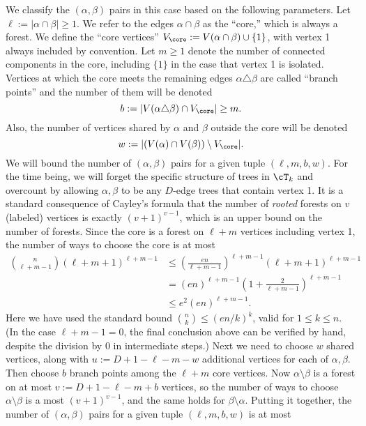 \documentclass[11pt]{article}
\begin{document}
We classify the $(\alpha,\beta)$ pairs in this case based on the following parameters. Let $\ell := |\alpha \cap \beta| \ge 1$. We refer to the edges $\alpha \cap \beta$ as the ``core,'' which is always a forest. We define the ``core vertices'' $V_\core := V(\alpha \cap \beta) \cup \{1\}$, with vertex 1 always included by convention. Let $m \ge 1$ denote the number of connected components in the core, including $\{1\}$ in the case that vertex 1 is isolated. Vertices at which the core meets the remaining edges $\alpha \triangle \beta$ are called ``branch points'' and the number of them will be denoted
\begin{equation}\label{eq:def-b}
b := |V(\alpha \triangle \beta) \cap V_\core| \ge m.
\end{equation}
Also, the number of vertices shared by $\alpha$ and $\beta$ outside the core will be denoted
\begin{equation}\label{eq:def-w}
w := |(V(\alpha) \cap V(\beta)) \setminus V_\core|.
\end{equation}
We will bound the number of $(\alpha,\beta)$ pairs for a given tuple $(\ell,m,b,w)$. For the time being, we will forget the specific structure of trees in $\cT_k$ and overcount by allowing $\alpha,\beta$ to be any $D$-edge trees that contain vertex 1. It is a standard consequence of Cayley's formula that the number of \emph{rooted} forests on $v$ (labeled) vertices is exactly $(v+1)^{v-1}$, which is an upper bound on the number of forests. Since the core is a forest on $\ell+m$ vertices including vertex 1, the number of ways to choose the core is at most
\begin{align*}
\binom{n}{\ell+m-1} (\ell+m+1)^{\ell+m-1}
&\le \left(\frac{en}{\ell+m-1}\right)^{\ell+m-1} (\ell+m+1)^{\ell+m-1} \\
&= (en)^{\ell+m-1} \left(1 + \frac{2}{\ell+m-1}\right)^{\ell+m-1} \\
&\le e^2 (en)^{\ell+m-1}.
\end{align*}
Here we have used the standard bound $\binom{n}{k} \le (en/k)^k$, valid for $1 \le k \le n$. (In the case $\ell+m-1 = 0$, the final conclusion above can be verified by hand, despite the division by 0 in intermediate steps.) Next we need to choose $w$ shared vertices, along with $u := D+1-\ell-m-w$ additional vertices for each of $\alpha,\beta$. Then choose $b$ branch points among the $\ell+m$ core vertices. Now $\alpha \setminus \beta$ is a forest on at most $v := D+1-\ell-m+b$ vertices, so the number of ways to choose $\alpha \setminus \beta$ is a most $(v+1)^{v-1}$, and the same holds for $\beta \setminus \alpha$. Putting it together, the number of $(\alpha,\beta)$ pairs for a given tuple $(\ell,m,b,w)$ is at most
\end{document}
